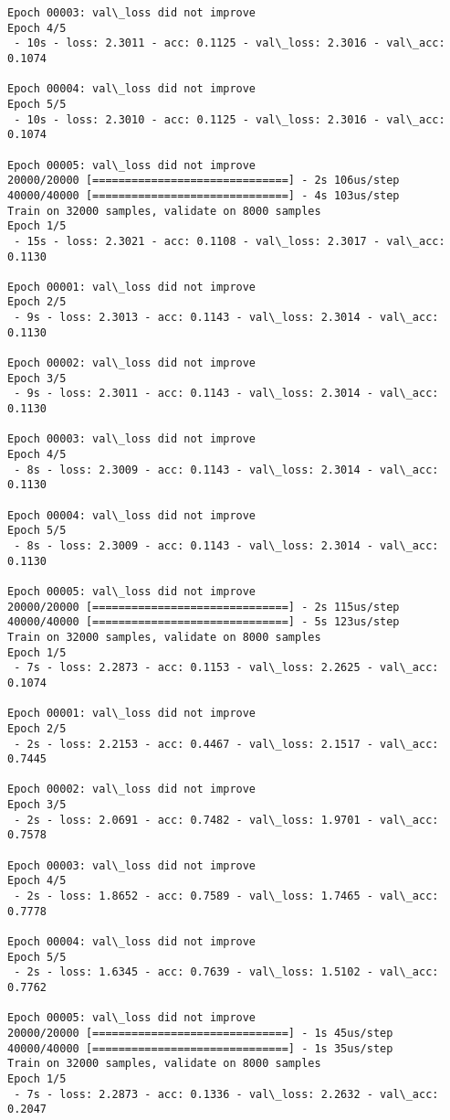 \documentclass[11pt]{article}
\begin{document}
\begin{Verbatim}[commandchars=\\\{\}]
Epoch 00003: val\_loss did not improve
Epoch 4/5
 - 10s - loss: 2.3011 - acc: 0.1125 - val\_loss: 2.3016 - val\_acc: 0.1074

Epoch 00004: val\_loss did not improve
Epoch 5/5
 - 10s - loss: 2.3010 - acc: 0.1125 - val\_loss: 2.3016 - val\_acc: 0.1074

Epoch 00005: val\_loss did not improve
20000/20000 [==============================] - 2s 106us/step
40000/40000 [==============================] - 4s 103us/step
Train on 32000 samples, validate on 8000 samples
Epoch 1/5
 - 15s - loss: 2.3021 - acc: 0.1108 - val\_loss: 2.3017 - val\_acc: 0.1130

Epoch 00001: val\_loss did not improve
Epoch 2/5
 - 9s - loss: 2.3013 - acc: 0.1143 - val\_loss: 2.3014 - val\_acc: 0.1130

Epoch 00002: val\_loss did not improve
Epoch 3/5
 - 9s - loss: 2.3011 - acc: 0.1143 - val\_loss: 2.3014 - val\_acc: 0.1130

Epoch 00003: val\_loss did not improve
Epoch 4/5
 - 8s - loss: 2.3009 - acc: 0.1143 - val\_loss: 2.3014 - val\_acc: 0.1130

Epoch 00004: val\_loss did not improve
Epoch 5/5
 - 8s - loss: 2.3009 - acc: 0.1143 - val\_loss: 2.3014 - val\_acc: 0.1130

Epoch 00005: val\_loss did not improve
20000/20000 [==============================] - 2s 115us/step
40000/40000 [==============================] - 5s 123us/step
Train on 32000 samples, validate on 8000 samples
Epoch 1/5
 - 7s - loss: 2.2873 - acc: 0.1153 - val\_loss: 2.2625 - val\_acc: 0.1074

Epoch 00001: val\_loss did not improve
Epoch 2/5
 - 2s - loss: 2.2153 - acc: 0.4467 - val\_loss: 2.1517 - val\_acc: 0.7445

Epoch 00002: val\_loss did not improve
Epoch 3/5
 - 2s - loss: 2.0691 - acc: 0.7482 - val\_loss: 1.9701 - val\_acc: 0.7578

Epoch 00003: val\_loss did not improve
Epoch 4/5
 - 2s - loss: 1.8652 - acc: 0.7589 - val\_loss: 1.7465 - val\_acc: 0.7778

Epoch 00004: val\_loss did not improve
Epoch 5/5
 - 2s - loss: 1.6345 - acc: 0.7639 - val\_loss: 1.5102 - val\_acc: 0.7762

Epoch 00005: val\_loss did not improve
20000/20000 [==============================] - 1s 45us/step
40000/40000 [==============================] - 1s 35us/step
Train on 32000 samples, validate on 8000 samples
Epoch 1/5
 - 7s - loss: 2.2873 - acc: 0.1336 - val\_loss: 2.2632 - val\_acc: 0.2047


\end{Verbatim}
\end{document}
